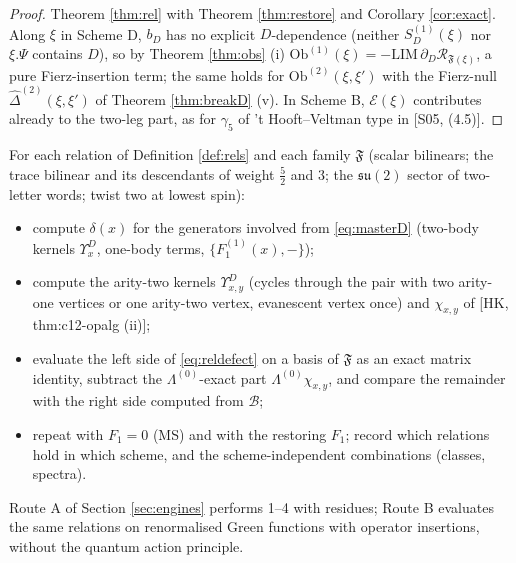 \begin{proof}
Theorem \ref{thm:rel} with Theorem \ref{thm:restore} and Corollary \ref{cor:exact}. Along $\xi$ in Scheme D, $b_D$ has no explicit $D$-dependence (neither $S^{(1)}_D(\xi)$ nor $\xi.\Psi$ contains $D$), so by Theorem \ref{thm:obs} (i) $\mathrm{Ob}^{(1)}(\xi)=-\mathrm{LIM}\,\partial_D\mathcal R_{\mathfrak F(\xi)}$, a pure Fierz-insertion term; the same holds for $\mathrm{Ob}^{(2)}(\xi,\xi')$ with the Fierz-null $\widehat\Delta^{(2)}(\xi,\xi')$ of Theorem \ref{thm:breakD} (v). In Scheme B, $\mathcal E(\xi)$ contributes already to the two-leg part, as for $\gamma_5$ of 't Hooft--Veltman type in [S05, (4.5)].
\end{proof}

\begin{definition}
\label{def:protocol}
For each relation of Definition \ref{def:rels} and each family $\mathfrak F$ (scalar bilinears; the trace bilinear and its descendants of weight $\frac52$ and $3$; the $\mathfrak{su}(2)$ sector of two-letter words; twist two at lowest spin):
\begin{itemize}
\item[1.] compute $\delta(x)$ for the generators involved from \eqref{eq:masterD} (two-body kernels $\Upsilon^D_x$, one-body terms, $\{F^{(1)}_1(x),-\}$);
\item[2.] compute the arity-two kernels $\Upsilon^D_{x,y}$ (cycles through the pair with two arity-one vertices or one arity-two vertex, evanescent vertex once) and $\chi_{x,y}$ of [HK, thm:c12-opalg (ii)];
\item[3.] evaluate the left side of \eqref{eq:reldefect} on a basis of $\mathfrak F$ as an exact matrix identity, subtract the $\Lambda^{(0)}$-exact part $\Lambda^{(0)}\chi_{x,y}$, and compare the remainder with the right side computed from $\mathcal B$;
\item[4.] repeat with $F_1=0$ (MS) and with the restoring $F_1$; record which relations hold in which scheme, and the scheme-independent combinations (classes, spectra).
\end{itemize}
Route A of Section \ref{sec:engines} performs 1--4 with residues; Route B evaluates the same relations on renormalised Green functions with operator insertions, without the quantum action principle.
\end{definition}

